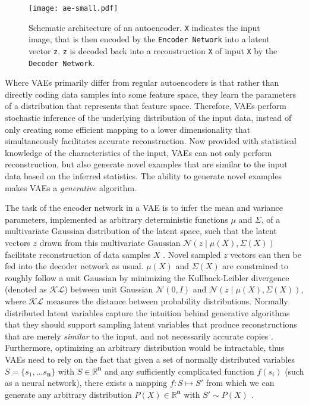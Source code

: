 \documentclass[twocolumn]{article}
\begin{document}
\begin{figure}
\centering
\texttt{[image: ae-small.pdf]}
\caption{Schematic architecture of an autoencoder. \texttt{X} indicates the input image, that is then encoded by the \texttt{Encoder Network} into a latent vector \texttt{z}. \texttt{z} is decoded back into a reconstruction \texttt{X\textquotesingle} of input \texttt{X} by the \texttt{Decoder Network}.}
\label{fig:ae}
\end{figure}

Where VAEs primarily differ from regular autoencoders is that rather
than directly coding data samples into some feature space, they learn
the parameters of a distribution that represents that feature space.
Therefore, VAEs perform stochastic inference of the underlying
distribution of the input data, instead of only creating some efficient
mapping to a lower dimensionality that simultaneously facilitates
accurate reconstruction. Now provided with statistical knowledge of the
characteristics of the input, VAEs can not only perform reconstruction,
but also generate novel examples that are similar to the input data
based on the inferred statistics. The ability to generate novel examples
makes VAEs a \emph{generative} algorithm.

The task of the encoder network in a VAE is to infer the mean and
variance parameters, implemented as arbitrary deterministic functions $\mu$ and $\Sigma$, of a multivariate Gaussian distribution of the latent space, such that the latent vectors
\(z\) drawn from this multivariate Gaussian \(\mathcal{N}(z \mathbin{\vert} \mu(X), \Sigma(X))\) facilitate reconstruction of data samples \(X\)
\citep{doersch2016tutorial}. Novel sampled \(z\) vectors can then be fed
into the decoder network as usual. \(\mu(X)\) and \(\Sigma(X)\) are
constrained to roughly follow a unit Gaussian by minimizing the
Kullback-Leibler divergence (denoted as \(\mathcal{KL}\)) between unit Gaussian
\(\mathcal{N}(0, I)\) and
\(\mathcal{N}(z \mathbin{\vert} \mu(X), \Sigma(X))\), where
\(\mathcal{KL}\) measures the distance between probability
distributions. Normally distributed latent variables capture the
intuition behind generative algorithms that they should support sampling
latent variables that produce reconstructions that are merely
\emph{similar} to the input, and not necessarily accurate copies \citep{doersch2016tutorial}.
Furthermore, optimizing an arbitrary distribution would be intractable,
thus VAEs need to rely on the fact that given a set of normally
distributed variables \(S = \{s_1, ... s_\mathbf{n}\}\) with
\(S \in \mathbb{R}^{\mathbf{n}}\) and any sufficiently complicated
function \(f(s_i)\) (such as a neural network), there exists a mapping
\(f: S \mapsto S'\) from which we can generate any arbitrary
distribution \(P(X) \in \mathbb{R}^{\mathbf{n}}\) with \(S' \sim P(X)\)
\citep{doersch2016tutorial}. \\
\end{document}
